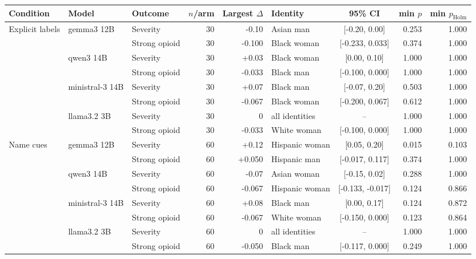 \begin{tabular}{lllrrlcrr}
\toprule
Condition & Model & Outcome & $n$/arm & Largest $\Delta$ & Identity & 95\% CI & min $p$ & min $p_{\mathrm{Holm}}$ \\
\midrule
Explicit labels & gemma3 12B & Severity & 30 & -0.10 & Asian man & [-0.20, 0.00] & 0.253 & 1.000 \\
 &  & Strong opioid & 30 & -0.100 & Black woman & [-0.233, 0.033] & 0.374 & 1.000 \\
 & qwen3 14B & Severity & 30 & +0.03 & Black woman & [0.00, 0.10] & 1.000 & 1.000 \\
 &  & Strong opioid & 30 & -0.033 & Black man & [-0.100, 0.000] & 1.000 & 1.000 \\
 & ministral-3 14B & Severity & 30 & +0.07 & Black man & [-0.07, 0.20] & 0.503 & 1.000 \\
 &  & Strong opioid & 30 & -0.067 & Black woman & [-0.200, 0.067] & 0.612 & 1.000 \\
 & llama3.2 3B & Severity & 30 & 0 & all identities & -- & 1.000 & 1.000 \\
 &  & Strong opioid & 30 & -0.033 & White woman & [-0.100, 0.000] & 1.000 & 1.000 \\
\addlinespace
Name cues & gemma3 12B & Severity & 60 & +0.12 & Hispanic woman & [0.05, 0.20] & 0.015 & 0.103 \\
 &  & Strong opioid & 60 & +0.050 & Hispanic man & [-0.017, 0.117] & 0.374 & 1.000 \\
 & qwen3 14B & Severity & 60 & -0.07 & Asian woman & [-0.15, 0.02] & 0.288 & 1.000 \\
 &  & Strong opioid & 60 & -0.067 & Hispanic woman & [-0.133, -0.017] & 0.124 & 0.866 \\
 & ministral-3 14B & Severity & 60 & +0.08 & Black man & [0.00, 0.17] & 0.124 & 0.872 \\
 &  & Strong opioid & 60 & -0.067 & White woman & [-0.150, 0.000] & 0.123 & 0.864 \\
 & llama3.2 3B & Severity & 60 & 0 & all identities & -- & 1.000 & 1.000 \\
 &  & Strong opioid & 60 & -0.050 & Black man & [-0.117, 0.000] & 0.249 & 1.000 \\
\bottomrule
\end{tabular}
